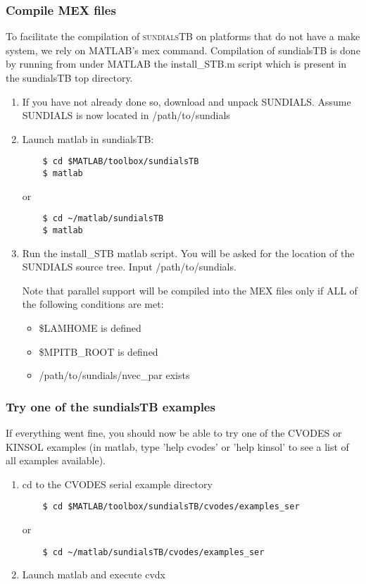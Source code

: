 \documentclass[titlepage,10pt]{article}
\newcommand{\sundialsTB}{{\normalfont\scshape sundialsTB}}
\begin{document}
\subsubsection{Compile MEX files}

To facilitate the compilation of {\sundialsTB} on platforms that do not have
a make system, we rely on MATLAB's mex command. Compilation of sundialsTB
is done by running from under MATLAB the install\_STB.m script which is
present in the sundialsTB top directory.

\begin{enumerate}

\item
  If you have not already done so, download and unpack SUNDIALS.
  Assume SUNDIALS is now located in /path/to/sundials

\item
  Launch matlab in sundialsTB:
\begin{verbatim}
    $ cd $MATLAB/toolbox/sundialsTB
    $ matlab
\end{verbatim}
  or
\begin{verbatim}
    $ cd ~/matlab/sundialsTB    
    $ matlab
\end{verbatim}

\item
  Run the install\_STB matlab script.
  You will be asked for the location of the SUNDIALS source tree. 
  Input /path/to/sundials.

  Note that parallel support will be compiled into the MEX files only if
  ALL of the following conditions are met:
  \begin{itemize}
     \item \$LAMHOME is defined
     \item \$MPITB\_ROOT is defined
     \item /path/to/sundials/nvec\_par exists 
   \end{itemize}

\end{enumerate}

\subsubsection{Try one of the sundialsTB examples}

If everything went fine, you should now be able to try one of the CVODES
or KINSOL examples (in matlab, type 'help cvodes' or 'help kinsol' to see
a list of all examples available).

\begin{enumerate}
\item
  cd to the CVODES serial example directory
\begin{verbatim}
    $ cd $MATLAB/toolbox/sundialsTB/cvodes/examples_ser
\end{verbatim}
  or
\begin{verbatim}
    $ cd ~/matlab/sundialsTB/cvodes/examples_ser
\end{verbatim}
\item
  Launch matlab and execute cvdx
\end{enumerate}
\end{document}
